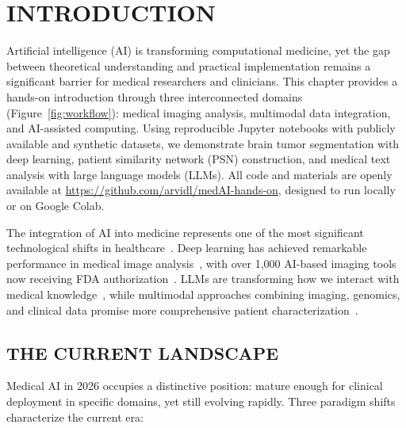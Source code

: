 \documentclass[krantz2,ChapterTOCs]{krantz}
\begin{document}
\section{INTRODUCTION}
\label{sec:introduction}

Artificial intelligence (AI) is transforming computational medicine, yet the gap between theoretical understanding and practical implementation remains a significant barrier for medical researchers and clinicians. 
This chapter provides a hands-on introduction through three interconnected domains (Figure~\ref{fig:workflow}): medical imaging analysis, multimodal data integration, and AI-assisted computing. 
Using reproducible Jupyter notebooks with publicly available and synthetic datasets, we demonstrate brain tumor segmentation with deep learning, patient similarity network (PSN) construction, and medical text analysis with large language models (LLMs). 
All code and materials are openly available at \url{https://github.com/arvidl/medAI-hands-on}, designed to run locally or on Google Colab.

The integration of AI into medicine represents one of the most significant technological shifts in healthcare~\citep{topol2019high, rajpurkar2022ai}. 
Deep learning has achieved remarkable performance in medical image analysis~\citep{esteva2019guide,lundervold2019overview}, with over 1,000 AI-based imaging tools now receiving FDA authorization~\citep{singh2025fda}. 
LLMs are transforming how we interact with medical knowledge~\citep{singhal2023large}, while multimodal approaches combining imaging, genomics, and clinical data promise more comprehensive patient characterization~\citep{acosta2022multimodal}.

\subsection{THE CURRENT LANDSCAPE}

Medical AI in 2026 occupies a distinctive position: mature enough for clinical deployment in specific domains, yet still evolving rapidly.
Three paradigm shifts characterize the current era:
\end{document}
